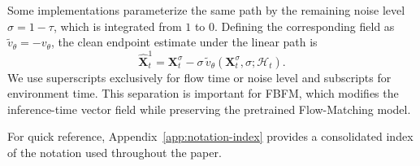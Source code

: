 Some implementations parameterize the same path by the remaining noise level
$\sigma=1-\tau$, which is integrated from $1$ to $0$. Defining the
corresponding field as
$\tilde v_\theta=-v_\theta$, the clean endpoint estimate under the linear path is
\begin{equation}
    \hat{\mathbf{X}}_t^1
    =
    \mathbf{X}_t^\sigma
    -\sigma\,
    \tilde v_\theta(\mathbf{X}_t^\sigma,\sigma;\mathcal{H}_t).
    \label{eq:clean-endpoint-estimate}
\end{equation}
We use superscripts exclusively for flow time or noise level and subscripts for
environment time. This separation is important for FBFM, which modifies the
inference-time vector field while preserving the pretrained Flow-Matching model.

For quick reference, Appendix~\ref{app:notation-index} provides a consolidated
index of the notation used throughout the paper.
